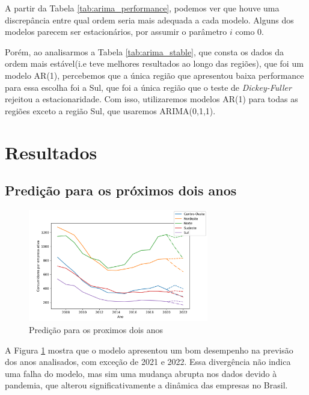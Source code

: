 \documentclass[12pt]{article}
\begin{document}
A partir da Tabela \ref{tab:arima_performance}, podemos ver que houve uma
discrepância entre qual ordem seria mais adequada a cada modelo. Alguns dos modelos
parecem ser estacionários, por assumir o parâmetro $i$ como 0.

Porém, ao analisarmos a Tabela \ref{tab:arima_stable}, que consta os dados da
ordem mais estável(i.e teve melhores resultados ao longo das regiões), que foi
um modelo AR(1), percebemos que a única região que apresentou baixa performance
para essa escolha foi a Sul, que foi a única região que o teste de
\textit{Dickey-Fuller} rejeitou a estacionaridade. Com isso, utilizaremos
modelos AR(1) para todas as regiões exceto a região Sul, que usaremos
ARIMA(0,1,1).

\section{Resultados} 

\subsection{Predição para os próximos dois anos} 

\begin{figure}[!htbp]
    \begin{center}
    \includegraphics[width=0.7\textwidth]{../figures/forecast.png}
    \caption{\label{fig:forecast} Predição para os proximos dois anos}
    \end{center}
\end{figure}

A Figura \ref{fig:forecast} mostra que o modelo apresentou um bom desempenho na
previsão dos anos analisados, com exceção de 2021 e 2022. Essa divergência não
indica uma falha do modelo, mas sim uma mudança abrupta nos dados devido à
pandemia, que alterou significativamente a dinâmica das empresas no Brasil.
\end{document}

